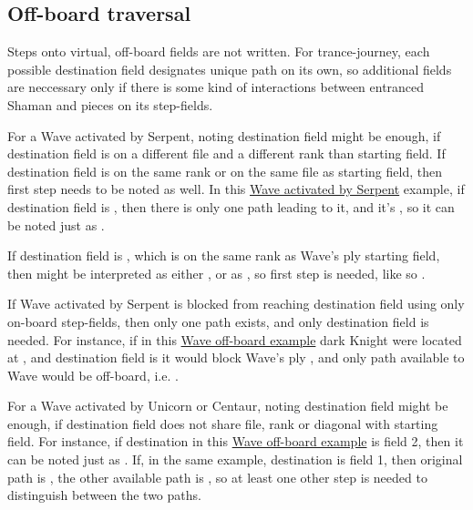 \subsection*{Off-board traversal}
\label{sec:Appendix/Notation/Off-board traversal}

Steps onto virtual, off-board fields are not written. For trance-journey, each possible
destination field designates unique path on its own, so additional fields are neccessary
only if there is some kind of interactions between entranced Shaman and pieces on its
step-fields.

For a Wave activated by Serpent, noting destination field might be enough, if destination
field is on a different file and a different rank than starting field. If destination field
is on the same rank or on the same file as starting field, then first step needs to be noted
as well. In this \hyperref[fig:scn_tr_18_serpent_activated_wave_ply]{Wave activated by Serpent}
example, if destination field is , then there is only one path leading to it, and
it's , so it can be noted just as .

If destination field is , which is on the same rank as Wave's ply starting field,
then  might be interpreted as either , or as %
, so first step is needed, like so .

If Wave activated by Serpent is blocked from reaching destination field using only on-board
step-fields, then only one path exists, and only destination field is needed. For instance,
if in this
\hyperref[fig:scn_tr_19_wave_out_of_board]{Wave off-board example} dark Knight were located at
, and destination field is  it would block Wave's ply ,
and only path available to Wave would be off-board, i.e. .

For a Wave activated by Unicorn or Centaur, noting destination field might be enough, if
destination field does not share file, rank or diagonal with starting field. For instance, if
destination in this \hyperref[fig:scn_mv_23_wave_off_board]{Wave off-board example} is field 2,
then it can be noted just as . If, in the same example, destination is field 1,
then original path is , the other available path is
, so at least one other step is needed to distinguish between the
two paths.

